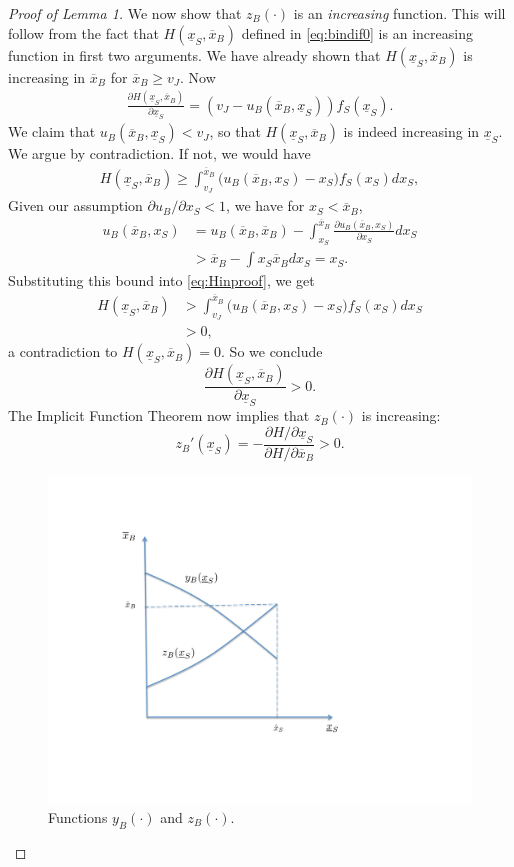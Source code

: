 \documentclass[11pt,twopage]{article}
\newcommand{\ol}{\overline}
\newcommand{\ul}{\underline}
\begin{document}
\begin{proof}[Proof of Lemma 1]
We now show that $z_B(\cdot)$ is an \emph{increasing} function. This will follow from the fact that
$ H(\underline x_S,\ol x_B)$ defined in \eqref{eq:bindif0}  is an
increasing function in first two arguments. We have already shown that $H(\ul x_S,\ol x_B)$ is increasing in $\ol x_B$ for $\ol x_B \geq v_J$. Now
\begin{align*}
  \frac{\partial H(\underline x_S,\ol x_B)}{\partial
    \ul x_S}= (v_J-u_B(\ol x_B,\ul x_S))f_S(\ul x_S).
    \end{align*}
We claim that $u_B(\ol x_B,\ul x_S)<v_J$, so that $H(\ul x_S, \ol x_B)$ is indeed increasing in $\ul x_S$. We argue by contradiction. If not, we would have 
\begin{align} 
H(\ul x_S, \ol x_B) \geq \int_{v_J}^{\ol x_B} \Big(  u_B(\ol x_B, x_S) - x_S \Big) f_S(x_S)dx_S,\label{eq:Hinproof}
\end{align}
Given our assumption $\partial u_B/\partial x_S <1$, we have for $x_S < \ol x_B$,
\begin{align*}
u_B(\ol x_B, x_S)& = u_B(\ol x_B, \ol x_B) - \int_{x_S}^{\ol x_B} \frac{\partial u_B(\ol x_B,x_S)}{\partial x_S} dx_S
\\
&> \ol x_B - \int{x_S}{\ol x_B} dx_S = x_S.
\end{align*}
Substituting this bound into \eqref{eq:Hinproof}, we get
\begin{align*}
H(\ul x_S, \ol x_B) &> \int_{v_J}^{\ol x_B} \Big( u_B(\ol x_B,x_S) - x_S \Big) f_S(x_S)dx_S
\\
&>0,
\end{align*}
a contradiction to $H(\ul x_S, \ol x_B) = 0$. So we conclude 
\[ \frac{\partial H(\underline x_S,\ol x_B)}{\partial
    \ul x_S}>0.
\]
The Implicit Function Theorem now implies that $z_B(\cdot)$ is increasing:
\[ z_B'(\ul x_S) = - \frac{\partial H/\partial \ul x_S}{\partial H /\partial \ol x_B}>0. \]    

\begin{figure}[ht]
\centering
\includegraphics[scale = 0.6]{graphics/intersection.pdf}
\caption{Functions $y_B(\cdot)$ and $z_B(\cdot)$.}
\label{fig:intersection}
\end{figure}



\end{proof}
\end{document}

